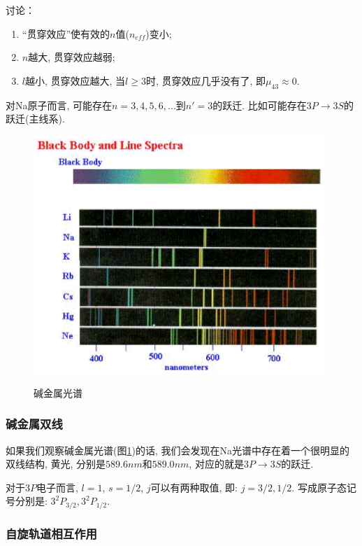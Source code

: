 讨论：

\begin{enumerate}
  \item ``贯穿效应''使有效的$n$值($n_{eff}$)变小;
  \item $n$越大, 贯穿效应越弱;
  \item $l$越小, 贯穿效应越大, 当$l \ge 3$时, 贯穿效应几乎没有了, 即$\mu_{43}\approx 0$.
\end{enumerate}

对Na原子而言, 可能存在$n=3,4,5,6,...$到$n'=3$的跃迁. 比如可能存在$3P
\to 3S$的跃迁(主线系).

\begin{figure}[h]
\begin{center}
  \includegraphics[width=11cm]{Spectrum/line-spectra.ps}\\
  \caption{碱金属光谱}\label{spectra for potassium atoms}
\end{center}
\end{figure}


\subsubsection{碱金属双线}



如果我们观察碱金属光谱(图\ref{spectra for potassium atoms})的话,
我们会发现在Na光谱中存在着一个很明显的双线结构, 黄光, 分别是$589.6
nm$和$589.0 nm$, 对应的就是$3P \to 3S$的跃迁.

对于$3P$电子而言, $l=1$, $s=1/2$, $j$可以有两种取值, 即: $j=3/2,
1/2$. 写成原子态记号分别是: $3^2P_{3/2}, 3^2P_{1/2}$.

\subsubsection{自旋轨道相互作用}

